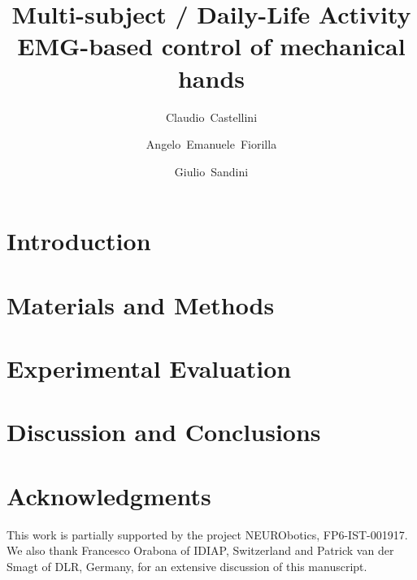 \documentclass[twocolumn,referee]{svjour2}
\begin{document}
\title{Multi-subject / Daily-Life Activity \\ EMG-based control of mechanical hands}

\author{Claudio~Castellini \and Angelo~Emanuele~Fiorilla \and Giulio~Sandini}

\maketitle

\begin{abstract}
  
\end{abstract}


\section{Introduction}
\label{sec:introduction}


\section{Materials and Methods}
\label{sec:m&ms}


\section{Experimental Evaluation}
\label{sec:exp}


\section{Discussion and Conclusions}
\label{sec:discussion}


\section*{Acknowledgments}

This work is partially supported by the project NEURObotics,
FP6-IST-001917. We also thank Francesco Orabona of IDIAP, Switzerland
and Patrick van der Smagt of DLR, Germany, for an extensive discussion
of this manuscript.

{\small
%


}
\end{document}
